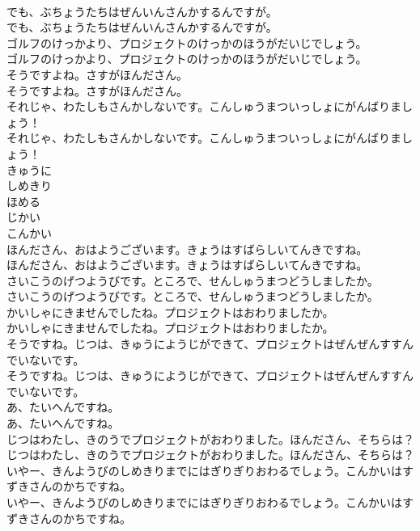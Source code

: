 \documentclass[8pt]{extreport}
\begin{document}
\begin{CJK}{UTF8}{min}
\\	でも、ぶちょうたちはぜんいんさんかするんですが。	
\\	でも、ぶちょうたちはぜんいんさんかするんですが。 
\\	ゴルフのけっかより、プロジェクトのけっかのほうがだいじでしょう。	
\\	ゴルフのけっかより、プロジェクトのけっかのほうがだいじでしょう。 
\\	そうですよね。さすがほんださん。	
\\	そうですよね。さすがほんださん。 
\\	それじゃ、わたしもさんかしないです。こんしゅうまついっしょにがんばりましょう！	
\\	それじゃ、わたしもさんかしないです。こんしゅうまついっしょにがんばりましょう！ 
\\	きゅうに
\\	しめきり
\\	ほめる
\\	じかい
\\	こんかい
\\	ほんださん、おはようございます。きょうはすばらしいてんきですね。	
\\	ほんださん、おはようございます。きょうはすばらしいてんきですね。 
\\	さいこうのげつようびです。ところで、せんしゅうまつどうしましたか。	
\\	さいこうのげつようびです。ところで、せんしゅうまつどうしましたか。 
\\	かいしゃにきませんでしたね。プロジェクトはおわりましたか。	
\\	かいしゃにきませんでしたね。プロジェクトはおわりましたか。 
\\	そうですね。じつは、きゅうにようじができて、プロジェクトはぜんぜんすすんでいないです。	
\\	そうですね。じつは、きゅうにようじができて、プロジェクトはぜんぜんすすんでいないです。 
\\	あ、たいへんですね。	
\\	あ、たいへんですね。 
\\	じつはわたし、きのうでプロジェクトがおわりました。ほんださん、そちらは？	
\\	じつはわたし、きのうでプロジェクトがおわりました。ほんださん、そちらは？ 
\\	いやー、きんようびのしめきりまでにはぎりぎりおわるでしょう。こんかいはすずきさんのかちですね。	
\\	いやー、きんようびのしめきりまでにはぎりぎりおわるでしょう。こんかいはすずきさんのかちですね。 

\end{CJK}
\end{document}
